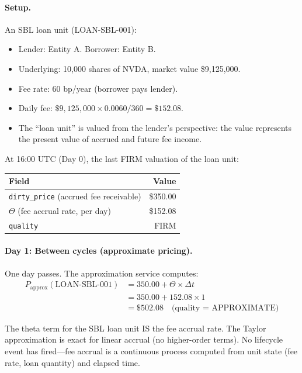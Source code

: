 \documentclass[11pt,a4paper]{article}
\begin{document}
\paragraph{Setup.}  An SBL loan unit (LOAN-SBL-001):
\begin{itemize}[nosep]
\item Lender: Entity A.  Borrower: Entity B.
\item Underlying: 10{,}000 shares of NVDA, market value \$9{,}125{,}000.
\item Fee rate: 60 bp/year (borrower pays lender).
\item Daily fee: $\$9{,}125{,}000 \times 0.0060 / 360 = \$152.08$.
\item The ``loan unit'' is valued from the lender's perspective: the value represents the present value of accrued and future fee income.
\end{itemize}

\noindent At 16:00 UTC (Day 0), the last FIRM valuation of the loan unit:
\begin{center}
\small
\begin{tabular}{l r}
\toprule
\textbf{Field} & \textbf{Value} \\
\midrule
\texttt{dirty\_price} (accrued fee receivable) & \$350.00 \\
$\Theta$ (fee accrual rate, per day) & \$152.08 \\
\texttt{quality} & FIRM \\
\bottomrule
\end{tabular}
\end{center}

\paragraph{Day 1: Between cycles (approximate pricing).}  One day passes.  The approximation service computes:
\begin{align*}
P_{\mathrm{approx}}(\text{LOAN-SBL-001}) &= 350.00 + \Theta \times \Delta t \\
&= 350.00 + 152.08 \times 1 \\
&= \$502.08 \quad\text{(quality = APPROXIMATE)}
\end{align*}

\noindent The theta term for the SBL loan unit IS the fee accrual rate.  The Taylor approximation is exact for linear accrual (no higher-order terms).  No lifecycle event has fired---fee accrual is a continuous process computed from unit state (fee rate, loan quantity) and elapsed time.
\end{document}
